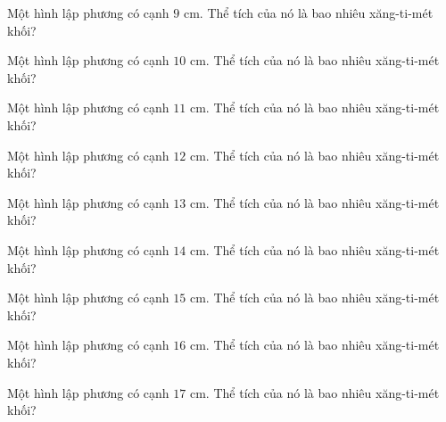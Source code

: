 \begin{ex}
  Một hình lập phương có cạnh $9\text{ cm}$. Thể tích của nó là bao nhiêu xăng-ti-mét khối?
\end{ex}

\begin{ex}
  Một hình lập phương có cạnh $10\text{ cm}$. Thể tích của nó là bao nhiêu xăng-ti-mét khối?
\end{ex}

\begin{ex}
  Một hình lập phương có cạnh $11\text{ cm}$. Thể tích của nó là bao nhiêu xăng-ti-mét khối?
\end{ex}

\begin{ex}
  Một hình lập phương có cạnh $12\text{ cm}$. Thể tích của nó là bao nhiêu xăng-ti-mét khối?
\end{ex}

\begin{ex}
  Một hình lập phương có cạnh $13\text{ cm}$. Thể tích của nó là bao nhiêu xăng-ti-mét khối?
\end{ex}

\begin{ex}
  Một hình lập phương có cạnh $14\text{ cm}$. Thể tích của nó là bao nhiêu xăng-ti-mét khối?
\end{ex}

\begin{ex}
  Một hình lập phương có cạnh $15\text{ cm}$. Thể tích của nó là bao nhiêu xăng-ti-mét khối?
\end{ex}

\begin{ex}
  Một hình lập phương có cạnh $16\text{ cm}$. Thể tích của nó là bao nhiêu xăng-ti-mét khối?
\end{ex}

\begin{ex}
  Một hình lập phương có cạnh $17\text{ cm}$. Thể tích của nó là bao nhiêu xăng-ti-mét khối?
\end{ex}


